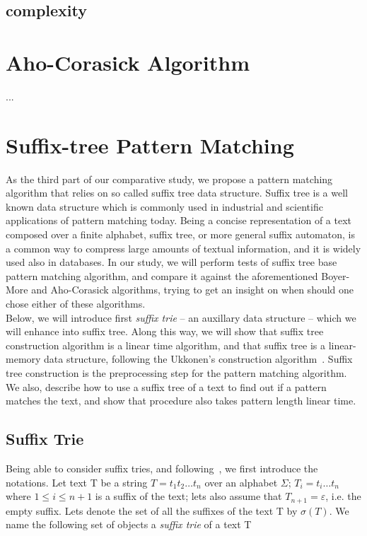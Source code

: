 \documentclass[paper=a4, fontsize=11pt]{scrartcl} %
\numberwithin{equation}{section} %
\numberwithin{figure}{section} %
\numberwithin{table}{section} %
\begin{document}
\subsection{complexity}

\newpage
\section{Aho-Corasick Algorithm}
...

\newpage
\section{Suffix-tree Pattern Matching}
As the third part of our comparative study, we propose a pattern matching algorithm that relies on so called suffix tree data structure. Suffix tree is a well known data structure which is commonly used in industrial and scientific applications of pattern matching today. Being a concise representation of a text composed over a finite alphabet, suffix tree, or more general suffix automaton, is a common way to compress large amounts of textual information, and it is widely used also in databases. In our study, we will perform tests of suffix tree base pattern matching algorithm, and compare it against the aforementioned Boyer-More and Aho-Corasick algorithms, trying to get an insight on when should one chose either of these algorithms.\\

Below, we will introduce first \textit{suffix trie} -- an auxillary data structure -- which we will enhance into suffix tree. Along this way, we will show that suffix tree construction algorithm is a linear time algorithm, and that suffix tree is a linear-memory data structure, following the Ukkonen's construction algorithm~\cite{ukkonen1995online}. Suffix tree construction is the preprocessing step for the pattern matching algorithm. We also, describe how to use a suffix tree of a text to find out if a pattern matches the text, and show that procedure also takes pattern length linear time.

\subsection{Suffix Trie}
Being able to consider suffix tries, and following~\cite{ukkonen1995online}, we first introduce the notations. Let text T be a string $T = t_1 t_2 \dots t_n$ over an alphabet $\Sigma$; $T_i = t_i \dots t_n$ where $1 \leq i \leq n+1$ is a suffix of the text; lets also assume that $T_{n+1} = \varepsilon$, i.e. the empty suffix. Lets denote the set of all the suffixes of the text T by $\sigma(T)$. We name the following set of objects a \textit{suffix trie} of a text T
\end{document}
